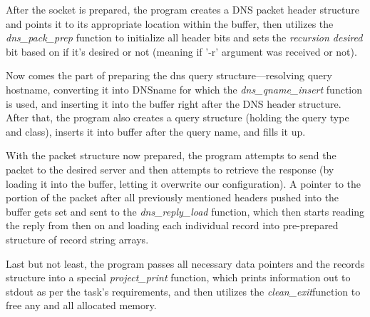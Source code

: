 \documentclass[a4paper, 11pt]{article}
\begin{document}
	After the socket is prepared, the program creates a DNS packet header structure and points 
	it to its appropriate location within the buffer, then utilizes the \textit{dns\_pack\_prep} 
	function to initialize all header bits and sets the \textit{recursion desired} bit based on 
	if it's desired or not (meaning if '-r' argument was received or not).

	Now comes the part of preparing the dns query structure---resolving query hostname, converting it 
	into DNSname for which the \textit{dns\_qname\_insert} function is used, and inserting it into 
	the buffer right after the DNS header structure. After that, the program also creates a query 
	structure (holding the query type and class), inserts it into buffer after the query name, and fills it up.

	With the packet structure now prepared, the program attempts to send the packet to the 
	desired server and then attempts to retrieve the response (by loading it into the buffer, letting it 
	overwrite our configuration). A pointer to the portion of the packet after all previously mentioned 
	headers pushed into the buffer gets set and sent to the \textit{dns\_reply\_load} function, 
	which then starts reading the reply from then on and loading each individual record 
	into pre-prepared structure of record string arrays.

	Last but not least, the program passes all necessary data pointers and the records structure 
	into a special \textit{project\_print} function, which prints information out to stdout as per 
	the task's requirements, and then utilizes the \textit{clean\_exit}function to free any and 
	all allocated memory.


	\newpage
	\renewcommand{\refname}{Used literature}
	
\end{document}
